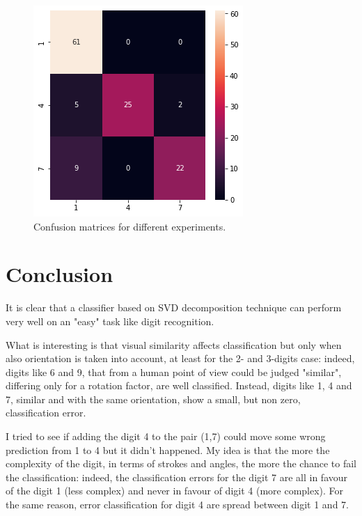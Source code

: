 \documentclass[a4paper,10pt]{report}
\begin{document}
\begin{figure}[!htb]
  \endminipage\hfill
  \includegraphics[width=\linewidth]{1_4_7_cm.png}
  \endminipage\hfill
  \caption{Confusion matrices for different experiments.}
  \label{fig:multiclass_cls_cm_2}
\end{figure}

\chapter{Conclusion}\label{chap:conclusion}
It is clear that a classifier based on SVD decomposition technique can perform very well on an "easy" task like digit recognition.

What is interesting is that visual similarity affects classification but only when also orientation is taken into account, at least for the 2- and 3-digits case: 
indeed, digits like 6 and 9, that from a human point of view could be judged "similar", differing only for a rotation factor, are well classified. 
Instead, digits like 1, 4 and 7, similar and with the same orientation, show a small, but non zero, classification error.

I tried to see if adding the digit 4 to the pair (1,7) could move some wrong prediction from 1 to 4 but it didn't happened.
My idea is that the more the complexity of the digit, in terms of strokes and angles, the more the chance to fail the classification: 
indeed, the classification errors for the digit 7 are all in favour of the digit 1 (less complex) and never in favour of digit 4 (more complex).
For the same reason, error classification for digit 4 are spread between digit 1 and 7.
\end{document}
